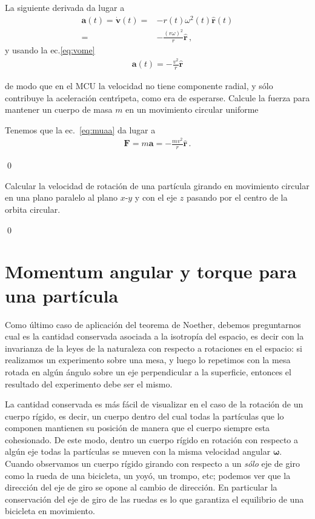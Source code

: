 La siguiente derivada da lugar a 
\begin{align*}
  \mathbf{a}(t)=\dot{\mathbf{v}}(t)=&-r(t)\omega^2(t)\hat{\mathbf{r}}(t)\nonumber\\
  =&-\frac{(r\omega)^2}{r}\hat{\mathbf{r}}\,,
\end{align*}
y usando la ec.\eqref{eq:vome}
\begin{align}
\label{eq:muaa}
  \mathbf{a}(t)=-\frac{v^2}{r}\hat{\mathbf{r}}
\end{align}

de modo que en el MCU la velocidad no tiene componente radial, y s\'olo
contribuye la aceleraci\'on centr\'\i peta, como era de esperarse.
Calcule la fuerza para mantener un cuerpo de masa $m$ en un movimiento circular uniforme


Tenemos que la ec.~\eqref{eq:muaa} da lugar a
\begin{align}
  \mathbf{F}=m\mathbf{a}=-\frac{m v^2}{r}\hat{\mathbf{r}}\,.
\end{align}


\qed



\ejemplo{} 
\label{eje:movim-gener-en}
Calcular la velocidad de rotación de una partícula 
girando en movimiento circular en una plano paralelo al plano $x$-$y$
y con el eje $z$ pasando por el centro de la orbita circular.

\qed


\section{Momentum angular y torque para una partícula}
Como último caso de aplicación del teorema de Noether, debemos
preguntarnos cual es la cantidad conservada asociada a la isotropía
del espacio, es decir con la invarianza de la leyes de la naturaleza
con respecto a rotaciones en el espacio: si realizamos un experimento
sobre una mesa, y luego lo repetimos con la mesa rotada en algún
ángulo sobre un eje perpendicular a la superficie, entonces el resultado
del experimento debe ser el mismo.

La cantidad conservada es más fácil de visualizar en el caso de la
rotación de un cuerpo rígido, es decir, un cuerpo dentro del cual
todas la partículas que lo componen mantienen su posición de manera
que el cuerpo siempre esta cohesionado. 
De este modo, dentro un cuerpo rígido en rotación con respecto a algún
eje todas la partículas se mueven con la misma velocidad angular
$\boldsymbol{\omega}$.
Cuando observamos un cuerpo rígido girando con respecto a un
\emph{sólo} eje de giro como la rueda de una bicicleta, un yoyó, un
trompo, etc; podemos ver que la dirección del eje de giro se opone al
cambio de dirección. 
En particular la conservación del eje de giro de las ruedas es lo que
garantiza el equilibrio de una bicicleta en movimiento.


